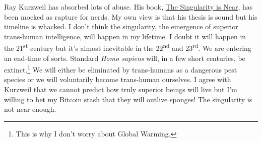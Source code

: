 Ray Kurzweil has absorbed lots of abuse. His book,
\href{http://www.amazon.com/The-Singularity-Is-Near-Transcend/dp/0143037889}{The
Singularity is Near}, has been mocked as rapture for nerds. My own view
is that his thesis is sound but his timeline is whacked. I don't think
the singularity, the emergence of superior trans-human intelligence,
will happen in my lifetime. I doubt it will happen in the
21\textsuperscript{st} century but it's almost inevitable in the
22\textsuperscript{nd} and 23\textsuperscript{rd}. We are entering an
end-time of sorts. Standard \emph{Homo sapiens }will, in a few short
centuries, be extinct.\footnote{This is why I don't worry
about Global Warming.
}
We will either be eliminated by trans-humans as a dangerous pest
species or %
 we will voluntarily
become trans-human ourselves. I agree with Kurzweil that we cannot
predict how truly superior beings will live but I'm willing to bet my
Bitcoin stash that they will outlive sponges! The singularity is not
near enough.


%